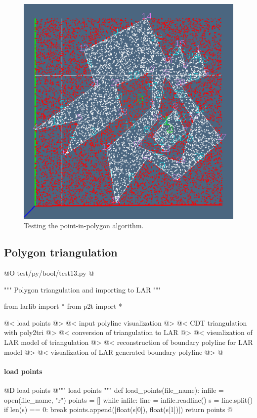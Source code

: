 \documentclass[11pt,oneside]{article}    %
\begin{document}
\begin{figure}[htbp] %
   \centering
   \includegraphics[width=0.5\linewidth]{images/pointInPolygon} 
   \caption{Testing the point-in-polygon algorithm.}
   \label{fig:pointInPolygon}
\end{figure}

\subsection{Polygon triangulation}

@O test/py/bool/test13.py
@{""" Polygon triangulation and importing to LAR """

from larlib import *
from p2t import *

@< load points @>
@< input polyline visualization @>
@< CDT triangulation with poly2tri @>
@< conversion of triangulation to LAR @>
@< visualization of LAR model of triangulation @>
@< reconstruction of boundary polyline for LAR model @>
@< visualization of LAR generated boundary polyline @>
@}



\paragraph{load points}
@D load points
@{""" load points """
def load_points(file_name):
    infile = open(file_name, "r")
    points = []
    while infile:
        line = infile.readline()
        s = line.split()
        if len(s) == 0:
            break
        points.append([float(s[0]), float(s[1])])
    return points
@}
\end{document}
